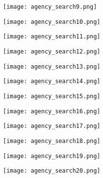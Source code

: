 \documentclass[11 pt, a4paper]{article}
\begin{document}
\begin{figure}[H]
\centering
\texttt{[image: agency\_search9.png]}
\end{figure}


\clearpage
\begin{figure}[H]
\centering
\texttt{[image: agency\_search10.png]}
\end{figure}


\begin{figure}[H]
\centering
\texttt{[image: agency\_search11.png]}
\end{figure}


\clearpage
\begin{figure}[H]
\centering
\texttt{[image: agency\_search12.png]}
\end{figure}


\begin{figure}[H]
\centering
\texttt{[image: agency\_search13.png]}
\end{figure}


\clearpage
\begin{figure}[H]
\centering
\texttt{[image: agency\_search14.png]}
\end{figure}


\begin{figure}[H]
\centering
\texttt{[image: agency\_search15.png]}
\end{figure}


\clearpage
\begin{figure}[H]
\centering
\texttt{[image: agency\_search16.png]}
\end{figure}


\begin{figure}[H]
\centering
\texttt{[image: agency\_search17.png]}
\end{figure}


\clearpage
\begin{figure}[H]
\centering
\texttt{[image: agency\_search18.png]}
\end{figure}


\begin{figure}[H]
\centering
\texttt{[image: agency\_search19.png]}
\end{figure}


\clearpage
\begin{figure}[H]
\centering
\texttt{[image: agency\_search20.png]}
\end{figure}
\end{document}
